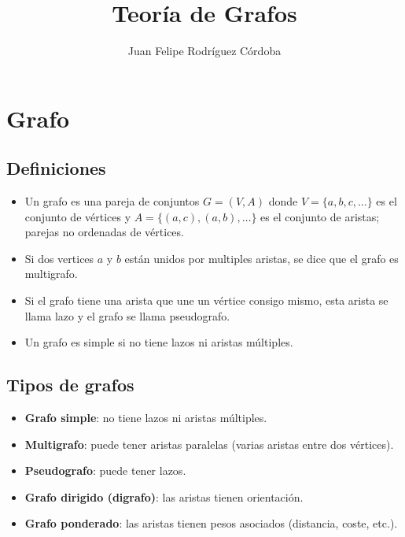 \documentclass[12pt]{article}
\title{Teoría de Grafos}
\author{Juan Felipe Rodríguez Córdoba}
\date{}
\theoremstyle{plain}
\theoremstyle{definition}
\theoremstyle{remark}
\begin{document}
\maketitle
\section*{Grafo}
\subsection*{Definiciones}
    \begin{itemize}
        \item Un grafo es una pareja de conjuntos $G = (V, A)$ donde $V = \{a, b, c, \dots\}$ es el conjunto de vértices y $A = \{(a, c), (a, b), \dots\}$ es el conjunto de aristas; parejas no ordenadas de vértices.
        \item Si dos vertices $a$ y $b$ están unidos por multiples aristas, se dice que el grafo es multigrafo.
        \item Si el grafo tiene una arista que une un vértice consigo mismo, esta arista se llama lazo y el grafo se llama pseudografo.
        \item Un grafo es simple si no tiene lazos ni aristas múltiples.
    \end{itemize}

\subsection*{Tipos de grafos}

\begin{itemize}
    \item \textbf{Grafo simple}: no tiene lazos ni aristas múltiples.
    \item \textbf{Multigrafo}: puede tener aristas paralelas (varias aristas entre dos vértices).
    \item \textbf{Pseudografo}: puede tener lazos.
    \item \textbf{Grafo dirigido (digrafo)}: las aristas tienen orientación.
    \item \textbf{Grafo ponderado}: las aristas tienen pesos asociados (distancia, coste, etc.).
\end{itemize}
\end{document}
